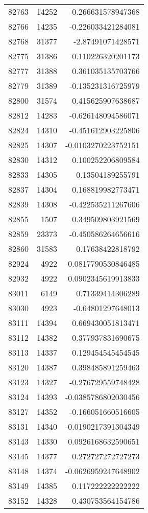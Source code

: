 \begin{tabular}{r | r | r}
82763 & 14252 & -0.266631578947368 \\
82766 & 14235 & -0.226033421284081 \\
82768 & 31377 & -2.87491071428571 \\
82775 & 31386 & 0.110226320201173 \\
82777 & 31388 & 0.361035135703766 \\
82779 & 31389 & -0.135231316725979 \\
82800 & 31574 & 0.415625907638687 \\
82812 & 14283 & -0.626148094586071 \\
82824 & 14310 & -0.451612903225806 \\
82825 & 14307 & -0.0103270223752151 \\
82830 & 14312 & 0.100252206809584 \\
82833 & 14305 & 0.13504189255791 \\
82837 & 14304 & 0.168819982773471 \\
82839 & 14308 & -0.422535211267606 \\
82855 & 1507 & 0.349509803921569 \\
82859 & 23373 & -0.450586264656616 \\
82860 & 31583 & 0.17638422818792 \\
82924 & 4922 & 0.0817790530846485 \\
82932 & 4922 & 0.0902345619913833 \\
83011 & 6149 & 0.71339414306289 \\
83030 & 4923 & -0.64801297648013 \\
83111 & 14394 & 0.669430051813471 \\
83112 & 14382 & 0.377937831690675 \\
83113 & 14337 & 0.129454545454545 \\
83120 & 14387 & 0.398485891259463 \\
83123 & 14327 & -0.276729559748428 \\
83124 & 14393 & -0.0385786802030456 \\
83127 & 14352 & -0.166051660516605 \\
83131 & 14340 & -0.0190217391304349 \\
83143 & 14330 & 0.0926168632590651 \\
83145 & 14377 & 0.272727272727273 \\
83148 & 14374 & -0.0626959247648902 \\
83149 & 14385 & 0.117222222222222 \\
83152 & 14328 & 0.430753564154786 \\

\end{tabular}
